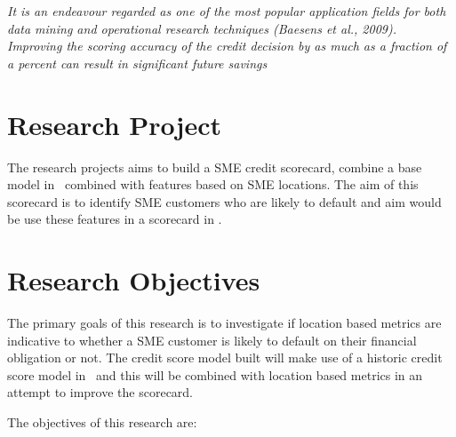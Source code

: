 \textit{It is an endeavour regarded as one of the most popular
application fields for both data mining and operational research techniques (Baesens
et al., 2009). Improving the scoring accuracy of the credit decision by as much as
a fraction of a percent can result in significant future savings}

\section{Research Project}
The research projects aims to build a SME credit scorecard, combine a base model in \subjectname\ combined with features based on SME locations. The aim of this scorecard is to identify SME customers who are likely to default and aim would be use these features in a scorecard in \subjectname.



\section{Research Objectives}
The primary goals of this research is to investigate if location based metrics are indicative to whether a SME customer is likely to default on their financial obligation or not. The credit score model built will make use of a historic credit score model in \subjectname\ and this will be combined with location based metrics in an attempt to improve the scorecard. 
 
The objectives of this research are:

